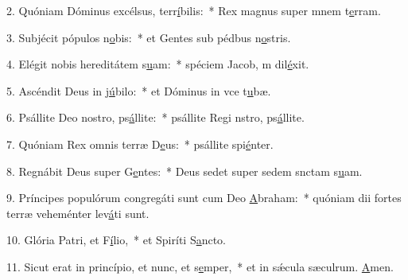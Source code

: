 2. Quóniam Dóminus excélsus, terr\uline{í}bilis:~* Rex magnus super mnem t\uline{e}rram.\par 
3. Subjécit pópulos n\uline{o}bis:~* et Gentes sub pédbus n\uline{o}stris.\par 
4. Elégit nobis hereditátem s\uline{u}am:~* spéciem Jacob, m dil\uline{é}xit.\par 
5. Ascéndit Deus in j\uline{ú}bilo:~* et Dóminus in vce t\uline{u}bæ.\par 
6. Psállite Deo nostro, ps\uline{á}llite:~* psállite Regi nstro, ps\uline{á}llite.\par 
7. Quóniam Rex omnis terræ D\uline{e}us:~* psállite spi\uline{é}nter.\par 
8. Regnábit Deus super G\uline{e}ntes:~* Deus sedet super sedem snctam s\uline{u}am.\par 
9. Príncipes populórum congregáti sunt cum Deo \uline{A}braham:~* quóniam dii fortes terræ veheménter lev\uline{á}ti sunt.\par 
10. Glória Patri, et F\uline{í}lio,~* et Spiríti S\uline{a}ncto.\par 
11. Sicut erat in princípio, et nunc, et s\uline{e}mper,~* et in sǽcula sæculrum. \uline{A}men.\par 
